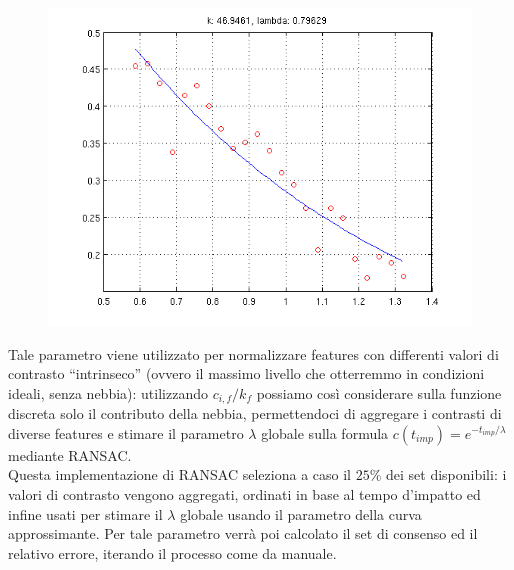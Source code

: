 \documentclass[12pt]{report}
\begin{document}
\begin{figure}[H]
	\centering
	\includegraphics[scale=0.6]{images/fitting.png}
	\label{fig:fitting}
\end{figure}

\noindent Tale parametro viene utilizzato per normalizzare features con differenti valori di contrasto ``intrinseco'' (ovvero il massimo livello che otterremmo in condizioni ideali, senza nebbia): utilizzando $c_{i,f}/k_f$ possiamo cos\`i considerare sulla funzione discreta solo il contributo della nebbia, permettendoci di aggregare i contrasti di diverse features e stimare il parametro $\lambda$ globale sulla formula $ c\left(t_{imp}\right) = e^{-t_{imp}/\lambda} $ mediante RANSAC.\\

\noindent Questa implementazione di RANSAC seleziona a caso il $25\%$ dei set disponibili: i valori di contrasto vengono aggregati, ordinati in base al tempo d'impatto ed infine usati per stimare il $\lambda$ globale usando il parametro della curva approssimante. Per tale parametro verr\`a poi calcolato il set di consenso ed il relativo errore, iterando il processo come da manuale.\\
\end{document}
